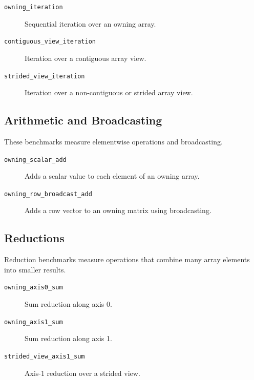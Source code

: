 \documentclass[11pt]{article}
\begin{document}
\begin{description}

    \item[\texttt{owning\_iteration}]
    Sequential iteration over an owning array.

    \item[\texttt{contiguous\_view\_iteration}]
    Iteration over a contiguous array view.

    \item[\texttt{strided\_view\_iteration}]
    Iteration over a non-contiguous or strided array view.

\end{description}


\subsection{Arithmetic and Broadcasting}

These benchmarks measure elementwise operations and broadcasting.

\begin{description}

    \item[\texttt{owning\_scalar\_add}]
    Adds a scalar value to each element of an owning array.

    \item[\texttt{owning\_row\_broadcast\_add}]
    Adds a row vector to an owning matrix using broadcasting.

\end{description}


\subsection{Reductions}

Reduction benchmarks measure operations that combine many array
elements into smaller results.

\begin{description}

    \item[\texttt{owning\_axis0\_sum}]
    Sum reduction along axis 0.

    \item[\texttt{owning\_axis1\_sum}]
    Sum reduction along axis 1.

    \item[\texttt{strided\_view\_axis1\_sum}]
    Axis-1 reduction over a strided view.

\end{description}
\end{document}
